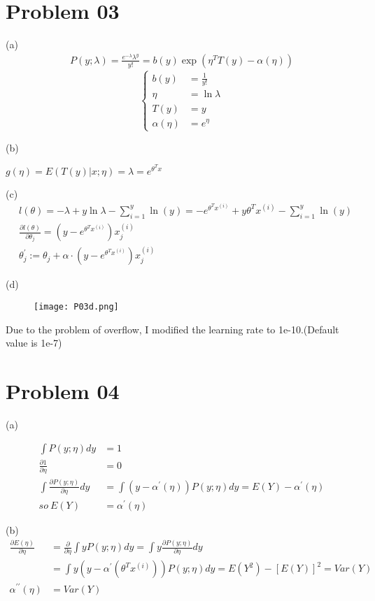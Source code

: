 \documentclass{article}
\begin{document}
\section{Problem 03}

(a)
\begin{align*}
    P(y;\lambda)=\frac{e^{-\lambda}\lambda^y}{y!}=b(y) \exp(\eta^TT(y)-\alpha(\eta))
\end{align*}
$$
\left\{
\begin{aligned}
    b(y)&=\frac{1}{y!}\\
   \eta &= \ln \lambda\\
   T(y)&=y\\
   \alpha(\eta)&=e^{\eta}
\end{aligned}
\right.
$$

(b)

$g(\eta)=E(T(y)|x;\eta)=\lambda=e^{\theta^Tx}$

(c)
\begin{align*} 
    &l(\theta)=-\lambda+y\ln\lambda-\sum_{i=1}^y\ln(y)=-e^{\theta^Tx^{(i)}}+y\theta^Tx^{(i)}-\sum_{i=1}^y\ln(y)\\
    &\frac{\partial l(\theta)}{\partial \theta_j}=(y-e^{\theta^Tx^{(i)}}) x^{(i)}_j\\
    &\theta_j^{\prime} :=\theta_j+\alpha\cdot(y-e^{\theta^Tx^{(i)}}) x^{(i)}_j
\end{align*}

(d)

\begin{figure}[H]
    \centering
    \texttt{[image: P03d.png]}
\end{figure}

Due to the problem of overflow, I modified the learning rate to 1e-10.(Default value is 1e-7)

\section{Problem 04}
(a)

\begin{align*}
    \int P(y;\eta)dy&=1\\
    \frac{\partial 1}{\partial \eta}&=0\\
    \int \frac{\partial P(y;\eta)}{\partial \eta} dy&=\int (y-\alpha^\prime(\eta))P(y;\eta)dy=E(Y)-\alpha^\prime(\eta)\\
    so\ E(Y)&=\alpha^\prime(\eta)
\end{align*}

(b)
\begin{align*}
    \frac{\partial E(\eta)}{\partial \eta}&=\frac{\partial}{\partial \eta}\int yP(y;\eta) dy=\int y \frac{\partial P(y;\eta)}{\partial \eta} dy\\
    &= \int y(y-\alpha^\prime(\theta^Tx^{(i)}))P(y;\eta) dy=E(Y^2)-[E(Y)]^2=Var(Y)\\
    \alpha^{\prime\prime}(\eta)&=Var(Y)
\end{align*}
\end{document}
